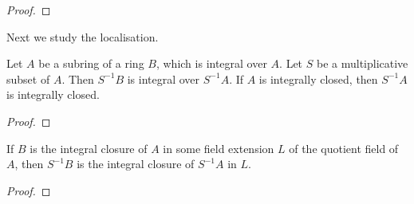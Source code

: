 		\begin{proof}
		\end{proof}
	
		Next we study the localisation.
		
		\begin{theorem}
			Let $A$ be a subring of a ring $B$, which is integral over $A$. Let $S$ be a multiplicative subset of $A$. Then $S^{-1}B$ is integral over $S^{-1}A$. If $A$ is integrally closed, then $S^{-1}A$ is integrally closed.
		\end{theorem}
	
		\begin{proof}
		\end{proof}
	
		\begin{corollary}
			If $B$ is the integral closure of $A$ in some field extension $L$ of the quotient field of $A$, then $S^{-1}B$ is the integral closure of $S^{-1}A$ in $L$.
		\end{corollary}
		\begin{proof}
		\end{proof}